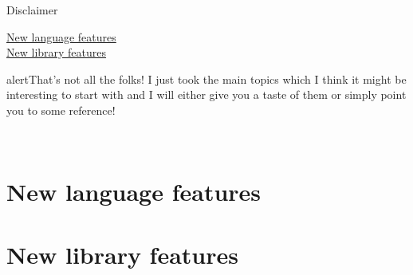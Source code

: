 \documentclass[usenames,dvipsnames,svgnames,14pt]{beamer}
\begin{document}
    \begin{frame}{Disclaimer}
        \vspace{-3mm}
        \centering
        \begin{center}
            \hyperlink{P1}{ New language features}\\[3mm]
            \hyperlink{P2}{ New library features}
        \end{center}
        \begin{varblock}{alert}{That's not all the folks!}
            I just took the main topics which I think it might be interesting to start with and I will either give you a taste of them or simply point you to some reference!
        \end{varblock}
        \bigskip
        \\[3mm]
    \end{frame}
    \label{P1}
    \part{New language features}
    
    \label{P2}
    \part{New library features}
    
\end{document}
